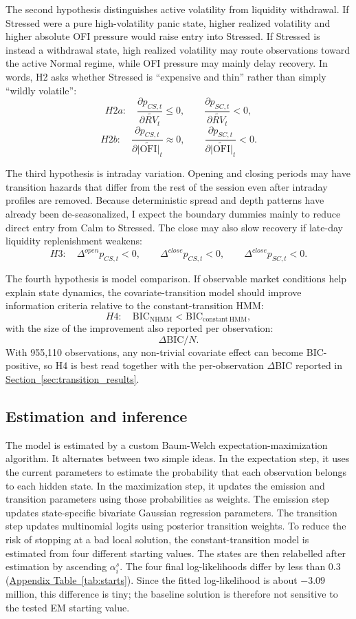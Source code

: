 \documentclass[12pt,a4paper]{article}
\newcommand{\OFI}{\mathrm{OFI}}
\newcommand{\apptabref}[1]{\hyperref[#1]{Appendix Table~\ref*{#1}}}
\newcommand{\secref}[1]{\hyperref[#1]{Section~\ref*{#1}}}
\begin{document}
The second hypothesis distinguishes active volatility from liquidity withdrawal. If Stressed were a pure high-volatility panic state, higher realized volatility and higher absolute OFI pressure would raise entry into Stressed. If Stressed is instead a withdrawal state, high realized volatility may route observations toward the active Normal regime, while OFI pressure may mainly delay recovery. In words, H2 asks whether Stressed is ``expensive and thin'' rather than simply ``wildly volatile'':
\[
H2a:\quad
\frac{\partial p_{CS,t}}{\partial \widetilde{RV}_t}\le 0,
\qquad
\frac{\partial p_{SC,t}}{\partial \widetilde{RV}_t}<0,
\]
\[
H2b:\quad
\frac{\partial p_{CS,t}}{\partial \widetilde{|\OFI|}_t}\approx 0,
\qquad
\frac{\partial p_{SC,t}}{\partial \widetilde{|\OFI|}_t}<0.
\]

The third hypothesis is intraday variation. Opening and closing periods may have transition hazards that differ from the rest of the session even after intraday profiles are removed. Because deterministic spread and depth patterns have already been de-seasonalized, I expect the boundary dummies mainly to reduce direct entry from Calm to Stressed. The close may also slow recovery if late-day liquidity replenishment weakens:
\[
H3:\quad
\Delta^{open}p_{CS,t}<0,
\qquad
\Delta^{close}p_{CS,t}<0,
\qquad
\Delta^{close}p_{SC,t}<0.
\]

The fourth hypothesis is model comparison. If observable market conditions help explain state dynamics, the covariate-transition model should improve information criteria relative to the constant-transition HMM:
\[
H4:\quad
\mathrm{BIC}_{\mathrm{NHMM}}<\mathrm{BIC}_{\mathrm{constant\ HMM}},
\]
with the size of the improvement also reported per observation:
\[
\Delta \mathrm{BIC}/N.
\]
With 955,110 observations, any non-trivial covariate effect can become BIC-positive, so H4 is best read together with the per-observation \(\Delta\)BIC reported in \secref{sec:transition_results}.

\subsection{Estimation and inference}\label{sec:estimation}

The model is estimated by a custom Baum-Welch expectation-maximization algorithm. It alternates between two simple ideas. In the expectation step, it uses the current parameters to estimate the probability that each observation belongs to each hidden state. In the maximization step, it updates the emission and transition parameters using those probabilities as weights. The emission step updates state-specific bivariate Gaussian regression parameters. The transition step updates multinomial logits using posterior transition weights. To reduce the risk of stopping at a bad local solution, the constant-transition model is estimated from four different starting values. The states are then relabelled after estimation by ascending \(\alpha^s_i\). The four final log-likelihoods differ by less than 0.3 (\apptabref{tab:starts}). Since the fitted log-likelihood is about \(-3.09\) million, this difference is tiny; the baseline solution is therefore not sensitive to the tested EM starting value.
\end{document}
